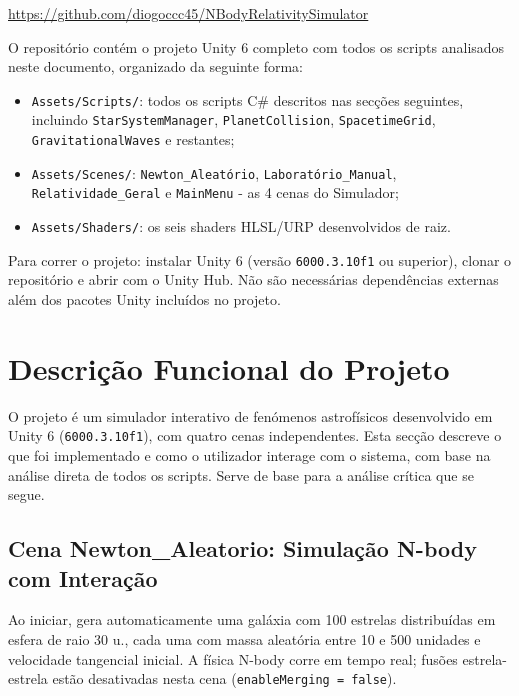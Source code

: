 \documentclass[12pt,a4paper]{article}
\begin{document}
\begin{center}
  \url{https://github.com/diogoccc45/NBodyRelativitySimulator}
\end{center}

O reposit\'{o}rio cont\'{e}m o projeto Unity 6 completo com todos os scripts analisados neste documento, organizado da seguinte forma:

\begin{itemize}
  \item \texttt{Assets/Scripts/}: todos os scripts C\# descritos nas sec\c{c}\~{o}es seguintes, incluindo \texttt{StarSystemManager}, \texttt{PlanetCollision}, \texttt{SpacetimeGrid}, \texttt{GravitationalWaves} e restantes;
  \item \texttt{Assets/Scenes/}: \texttt{Newton\_Aleat\'{o}rio}, \texttt{Laborat\'{o}rio\_Manual}, \texttt{Relatividade\_Geral} e \texttt{MainMenu} - as 4 cenas do Simulador;
  \item \texttt{Assets/Shaders/}: os seis shaders HLSL/URP desenvolvidos de raiz.
\end{itemize}

Para correr o projeto: instalar Unity 6 (vers\~{a}o \texttt{6000.3.10f1} ou superior), clonar o reposit\'{o}rio e abrir com o Unity Hub. N\~{a}o s\~{a}o necess\'{a}rias depend\^{e}ncias externas al\'{e}m dos pacotes Unity inclu\'{i}dos no projeto.

\section{Descri\c{c}\~{a}o Funcional do Projeto}

O projeto \'{e} um simulador interativo de fen\'{o}menos astrof\'{i}sicos desenvolvido em Unity 6 (\texttt{6000.3.10f1}), com quatro cenas independentes. Esta sec\c{c}\~{a}o descreve o que foi implementado e como o utilizador interage com o sistema, com base na an\'{a}lise direta de todos os scripts. Serve de base para a an\'{a}lise cr\'{i}tica que se segue.

\subsection{Cena Newton\_Aleatorio: Simula\c{c}\~{a}o N-body com Intera\c{c}\~{a}o}

Ao iniciar, gera automaticamente uma gal\'{a}xia com 100 estrelas distribu\'{i}das em esfera de raio 30 u., cada uma com massa aleat\'{o}ria entre 10 e 500 unidades e velocidade tangencial inicial. A f\'{i}sica N-body corre em tempo real; fus\~{o}es estrela-estrela est\~{a}o desativadas nesta cena (\texttt{enableMerging = false}).
\end{document}

